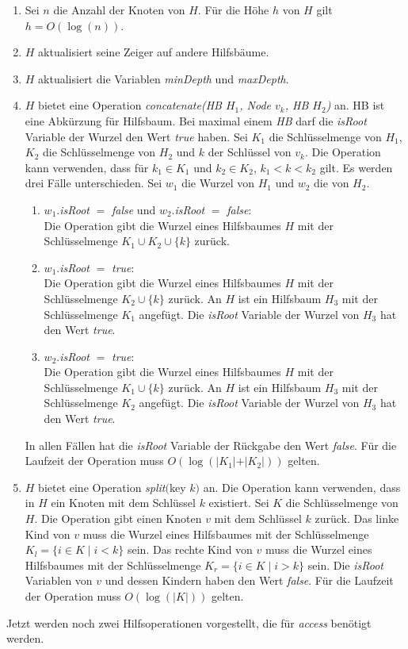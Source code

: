 \documentclass[a4paper,12pt]{article}
\begin{document}
\begin{enumerate}
	\item Sei $n$ die Anzahl der Knoten von $H$. Für die Höhe $h$ von $H$ gilt \mbox{$h = O\left(\log \left(n\right)\right)$}.
	\item $H$ aktualisiert seine Zeiger auf andere Hilfsbäume.
	\item $H$ aktualisiert die Variablen  \textit{minDepth} und \textit{maxDepth}.
	\item $H$ bietet eine Operation \textit{concatenate(HB $H_1$, Node $v_k$, HB  $H_2$)} an. HB ist eine Abkürzung für Hilfsbaum. Bei maximal einem \textit{HB}  darf die \textit{isRoot} Variable der Wurzel den Wert \textit{true} haben. Sei $K_1$ die Schlüsselmenge von $H_1$, $K_2$ die Schlüsselmenge von $H_2$ und $k$ der Schlüssel von $v_k$. Die Operation kann verwenden, dass für $k_1 \in K_1$ und $k_2 \in K_2$, $k_1 < k < k_2$ gilt. Es werden drei Fälle unterschieden. Sei $w_1$ die Wurzel von $H_1$ und $w_2$ die von $H_2$.
	\begin{enumerate}
		\item $w_1$.\textit{isRoot} $=$ \textit{false} und $w_2$.\textit{isRoot} $=$ \textit{false}:\\
		Die Operation gibt die Wurzel eines Hilfsbaumes $H$ mit der Schlüsselmenge $K_1 \cup K_2 \cup \{k\} $ zurück.
		\item $w_1$.\textit{isRoot} $=$ \textit{true}:\\	
		Die Operation gibt die Wurzel eines Hilfsbaumes $H$ mit der Schlüsselmenge $K_2 \cup \{k\} $ zurück. An $H$ ist ein Hilfsbaum $H_3$ mit der Schlüsselmenge $K_1$ angefügt. Die \textit{isRoot} Variable der Wurzel von $H_3$ hat den Wert \textit{true}.
		\item $w_2$.\textit{isRoot} $=$ \textit{true}:\\	
		Die Operation gibt die Wurzel eines Hilfsbaumes $H$ mit der Schlüsselmenge $K_1 \cup \{k\} $ zurück. An $H$ ist ein Hilfsbaum $H_3$ mit der Schlüsselmenge $K_2$ angefügt. Die \textit{isRoot} Variable  der Wurzel von $H_3$ hat den Wert \textit{true}.	 
	\end{enumerate}
	In allen Fällen hat die \textit{isRoot} Variable der Rückgabe den Wert \textit{false}.
	Für die Laufzeit der Operation muss $O\left(\log \left(\vert K_1 \vert + \vert K_2 \vert\right)\right)$ gelten.
	\item $H$ bietet eine Operation \textit{split}$($key $k)$ an. Die Operation kann verwenden, dass in $H$ ein Knoten mit dem Schlüssel $k$ existiert. Sei $K$ die Schlüsselmenge von $H$. Die Operation gibt einen Knoten $v$ mit dem Schlüssel $k$ zurück. Das linke Kind von $v$ muss die Wurzel eines Hilfsbaumes mit der Schlüsselmenge ${K_l=\{i\in K \mid  i <k\}}$ sein. Das rechte Kind von $v$ muss die Wurzel eines Hilfsbaumes mit der Schlüsselmenge ${K_r=\{i\in K \mid  i > k\}}$ sein. Die  \textit{isRoot} Variablen von $v$ und dessen Kindern haben den Wert \textit{false}. Für die Laufzeit der Operation muss $O\left(\log \left(\vert K \vert\right) \right)$ gelten.
\end{enumerate} 
Jetzt werden noch zwei Hilfsoperationen vorgestellt, die für \textit{access} benötigt werden.\\
\end{document}
